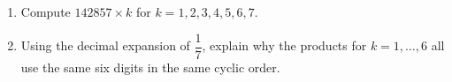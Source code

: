 \begin{enumerate}
\item[(a)] Compute $142857\times k$ for $k=1,2,3,4,5,6,7$.
\item[(b)] Using the decimal expansion of $\dfrac{1}{7}$, explain why the products for $k=1,\dots,6$ all use the same six digits in the same cyclic order.
\end{enumerate}
